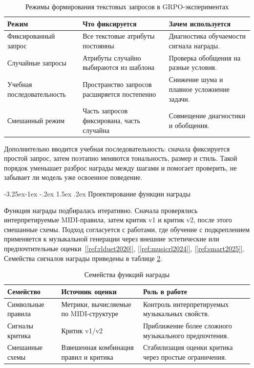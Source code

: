\documentclass[a4paper,12pt]{extarticle}
\makeatletter
\newcommand{\sourcecite}[1]{\hyperref[#1]{[\ref*{#1}]}}
\renewcommand\subsection{\@startsection{subsection}{2}{\z@}%
  {-3.25ex\@plus -1ex \@minus -.2ex}%
  {1.5ex \@plus .2ex}%
  {\normalfont\large\bfseries\Needspace{6\baselineskip}}}
\makeatother
\begin{document}
\begin{table}[ht]
\centering
\caption{Режимы формирования текстовых запросов в GRPO-экспериментах}
\label{tab:prompt_regimes}
\begin{tabular}{|p{}|p{}|p{}|}
\hline
\textbf{Режим} & \textbf{Что фиксируется} & \textbf{Зачем используется} \\
\hline
Фиксированный запрос & Все текстовые атрибуты постоянны & Диагностика обучаемости сигнала награды. \\
\hline
Случайные запросы & Атрибуты случайно выбираются из шаблона & Проверка обобщения на разные условия. \\
\hline
Учебная последовательность & Пространство запросов расширяется постепенно & Снижение шума и плавное усложнение задачи. \\
\hline
Смешанный режим & Часть запросов фиксирована, часть случайна & Совмещение диагностики и обобщения. \\
\hline
\end{tabular}
\end{table}

Дополнительно вводится учебная последовательность: сначала фиксируется простой
запрос, затем поэтапно меняются тональность, размер и стиль. Такой порядок
уменьшает разброс награды между шагами и помогает проверить, не
забывает ли модель уже освоенное поведение.

\subsection{Проектирование функции награды}

Функция награды подбиралась итеративно. Сначала проверялись
интерпретируемые MIDI-правила, затем критик v1 и критик v2, после этого
смешанные схемы. Подход согласуется с работами, где обучение с подкреплением
применяется к музыкальной генерации через внешние эстетические или
предпочтительные оценки~\sourcecite{ref:rlduet2020}, \sourcecite{ref:musicrl2024}, \sourcecite{ref:smart2025}.
Семейства сигналов награды приведены в таблице \ref{tab:reward_families}.

\begin{table}[ht]
\centering
\caption{Семейства функций награды}
\label{tab:reward_families}
\begin{tabular}{|p{}|p{}|p{}|}
\hline
\textbf{Семейство} & \textbf{Источник оценки} & \textbf{Роль в работе} \\
\hline
Символьные правила & Метрики, вычисляемые по MIDI-структуре & Контроль интерпретируемых музыкальных свойств. \\
\hline
Сигналы критика & Критик v1/v2 & Приближение более сложного музыкального предпочтения. \\
\hline
Смешанные схемы & Взвешенная комбинация правил и критика & Стабилизация оценки критика через простые ограничения. \\
\hline
\end{tabular}
\end{table}
\end{document}
